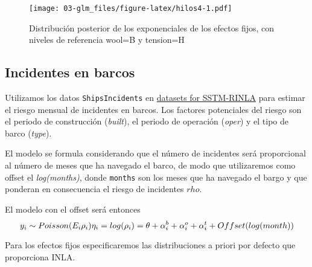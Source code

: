 \documentclass[
]{book}
\begin{document}
\begin{figure}
\centering
\texttt{[image: 03-glm\_files/figure-latex/hilos4-1.pdf]}
\caption{\label{fig:hilos4}Distribución posterior de los exponenciales de los efectos fijos, con niveles de referencia wool=B y tension=H}
\end{figure}

\hypertarget{incidentes-en-barcos}{%
\subsection{Incidentes en barcos}\label{incidentes-en-barcos}}

Utilizamos los datos \texttt{ShipsIncidents} en \href{https://sites.google.com/a/r-inla.org/stbook/datasets}{datasets for
SSTM-RINLA} para
estimar el riesgo mensual de incidentes en barcos. Los factores
potenciales del riesgo son el periodo de construcción (\emph{built}), el
periodo de operación (\emph{oper}) y el tipo de barco (\emph{type}).

El modelo se formula considerando que el número de incidentes será proporcional al número de meses que ha navegado el barco, de modo que utilizaremos como offset el \emph{log(months)}, donde \texttt{months} son los meses que ha navegado el bargo y que ponderan en consecuencia el riesgo de incidentes \(rho\).

El modelo con el offset será entonces
\[y_i \sim Poisson (E_i \rho_i)\\
\eta_i=log(\rho_i)= \theta + \alpha_i^b+\alpha_i^o+\alpha_i^t+Offset(log(month))\]

Para los efectos fijos especificaremos las distribuciones a priori por defecto que proporciona INLA.
\end{document}
